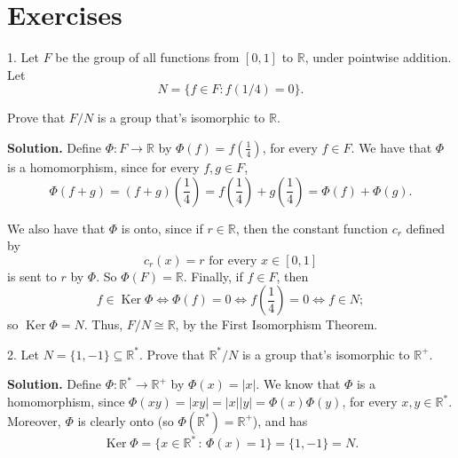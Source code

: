 \documentclass[10pt,]{book}
\theoremstyle{plain}
\theoremstyle{definition}
\theoremstyle{definition}
\theoremstyle{definition}
\theoremstyle{definition}
\numberwithin{equation}{section}
\def\R{\mathbb{R}}
\DeclareMathOperator{\Ker}{Ker}
\begin{document}
\section[{Exercises}]{Exercises}\label{exercises-9}
\begin{exerciselist}
\item[1.]\hypertarget{exercise-59}{}Let \(F\) be the group of all functions from \([0,1]\) to \(\R\), under pointwise addition. Let%
\begin{equation*}
N=\{f\in F:
f(1/4)=0\}.
\end{equation*}
%
\par
Prove that \(F/N\) is a group that's isomorphic to \(\R\).%
\par\smallskip
\par\smallskip
\noindent\textbf{Solution.}\hypertarget{solution-59}{}\quad
Define \(\Phi:F\rightarrow \R\) by \(\Phi(f)=f\left(\frac{1}{4}\right)\), for every \(f\in F\). We have that \(\Phi\) is a homomorphism, since for every \(f, g\in F\),%
\begin{equation*}
\Phi(f+g)=(f+g)\left(\frac{1}{4}\right)=f\left(\frac{1}{4}\right)+g\left(\frac{1}{4}\right)=\Phi(f)+\Phi(g).
\end{equation*}
%
\par
We also have that \(\Phi\) is onto, since if \(r\in \R\), then the constant function \(c_r\) defined by%
\begin{equation*}
c_r(x)=r \mbox{ for every \(x\in
[0,1]\)}
\end{equation*}
is sent to \(r\) by \(\Phi\). So \(\Phi(F)=\R\). Finally, if \(f\in F\), then%
\begin{equation*}
f\in \Ker \Phi \Leftrightarrow \Phi(f)=0 \Leftrightarrow
f\left(\frac{1}{4}\right)=0 \Leftrightarrow f\in N;
\end{equation*}
so \(\Ker
\Phi=N\). Thus, \(F/N \cong \R\), by the First Isomorphism Theorem.%
\item[2.]\hypertarget{exercise-60}{}Let \(N=\{1,-1\}\subseteq \R^*\). Prove that \(\R^*/N\) is a group that's isomorphic to \(\R^+\).%
\par\smallskip
\par\smallskip
\noindent\textbf{Solution.}\hypertarget{solution-60}{}\quad
Define \(\Phi: \R^* \rightarrow \R^+\) by \(\Phi(x)=|x|\). We know that \(\Phi\) is a homomorphism, since \(\Phi(xy)=|xy|=|x||y|=\Phi(x)\Phi(y)\), for every \(x,y\in \R^*\). Moreover, \(\Phi\) is clearly onto (so \(\Phi(\R^*)=\R^+\)), and has%
\begin{equation*}
\Ker \Phi=\{x\in \R^*\,:\,\Phi(x)=1\}=\{1,-1\}=N.

\end{equation*}
\end{exerciselist}
\end{document}
